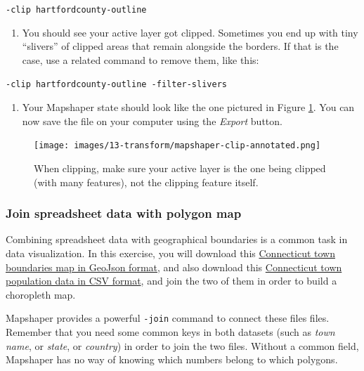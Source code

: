 \documentclass[
  english,
]{book}
\providecommand{\tightlist}{%
  \setlength{\itemsep}{0pt}\setlength{\parskip}{0pt}}
\begin{document}
\texttt{-clip\ hartfordcounty-outline}

\begin{enumerate}
\def\labelenumi{\arabic{enumi}.}
\setcounter{enumi}{3}
\tightlist
\item
  You should see your active layer got clipped. Sometimes you end up with tiny ``slivers'' of clipped areas that remain alongside the borders.
  If that is the case, use a related command to remove them, like this:
\end{enumerate}

\texttt{-clip\ hartfordcounty-outline\ -filter-slivers}

\begin{enumerate}
\def\labelenumi{\arabic{enumi}.}
\setcounter{enumi}{4}
\tightlist
\item
  Your Mapshaper state should look like the one pictured in Figure \ref{fig:mapshaper-clip}. You can now save the file on your computer using the \emph{Export} button.
\end{enumerate}



\begin{figure}
\centering
\texttt{[image: images/13-transform/mapshaper-clip-annotated.png]}
\caption{\label{fig:mapshaper-clip}When clipping, make sure your active layer is the one being clipped (with many features), not the clipping feature itself.}
\end{figure}

\hypertarget{join-spreadsheet-data-with-polygon-map}{%
\subsubsection*{Join spreadsheet data with polygon map}\label{join-spreadsheet-data-with-polygon-map}}

Combining spreadsheet data with geographical boundaries is a common task in data visualization. In this exercise, you will download this \href{data/ct-towns.geojson}{Connecticut town boundaries map in GeoJson format},
and also download this \href{data/ct-towns-popdensity.csv}{Connecticut town population data in CSV format}, and join the two of them in order to build a choropleth map.

Mapshaper provides a powerful \texttt{-join} command to connect these files files. Remember that you need some common keys
in both datasets (such as \emph{town name}, or \emph{state}, or \emph{country}) in order to join the two files. Without a common field, Mapshaper has no way of knowing which
numbers belong to which polygons.
\end{document}
